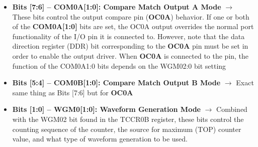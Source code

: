 \begin{itemize}
    \item \textbf{Bits [7:6] – COM0A[1:0]: Compare Match Output A Mode} $\bm{\rightarrow}$ These bits control the output compare pin (\textbf{OC0A}) behavior. If one or both of the \textbf{COM0A[1:0]} bits are set, the OC0A output overrides the normal port functionality of the I/O pin it is connected to. However, note that the data direction register (DDR) bit corresponding to the \textbf{OC0A} pin must be set in order to enable the output driver. When \textbf{OC0A} is connected to the pin, the function of the COM0A1:0 bits depends on the WGM02:0 bit setting
    

    \begin{table}[H]
    \end{table}


    \item \textbf{Bits [5:4] – COM0B[1:0]: Compare Match Output B Mode} $\bm{\rightarrow}$ Exact same thing as Bits [7:6] but for \textbf{OC0A}
    
    \clearpage

    \item \textbf{Bits [1:0] – WGM0[1:0]: Waveform Generation Mode} $\bm{\rightarrow}$ Combined with the WGM02 bit found in the TCCR0B register, these bits control the counting sequence of the counter, the source for maximum (TOP) counter value, and what type of waveform generation to be used.
    
    \begin{table}[H]
\end{table}
\end{itemize}
